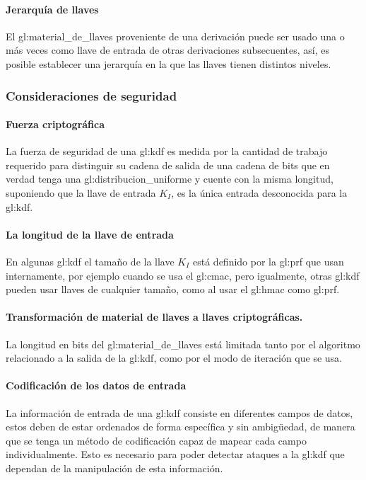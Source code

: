\paragraph{Jerarquía de llaves}
El \gls{gl:material_de_llaves} proveniente de una derivación puede ser usado
una o más veces como llave de entrada de otras derivaciones subsecuentes, así,
es posible establecer una jerarquía en la que las llaves tienen distintos
niveles.

\subsubsection{Consideraciones de seguridad}

\paragraph{Fuerza criptográfica}
La fuerza de seguridad de una \gls{gl:kdf} es medida por la cantidad de
trabajo requerido para distinguir su cadena de salida de una cadena de bits
que en verdad tenga una \gls{gl:distribucion_uniforme} y cuente con la misma
longitud, suponiendo que la llave de entrada $K_I$, es la única entrada
desconocida para la \gls{gl:kdf}.

\paragraph{La longitud de la llave de entrada}
En algunas \gls{gl:kdf} el tamaño de la llave $K_I$ está definido por la
\gls{gl:prf} que usan internamente, por ejemplo cuando se usa el \gls{gl:cmac},
pero igualmente, otras \gls{gl:kdf} pueden usar llaves de cualquier tamaño,
como al usar el \gls{gl:hmac} como \gls{gl:prf}.

\paragraph{Transformación de material de llaves a llaves criptográficas.}
La longitud en bits del \gls{gl:material_de_llaves} está limitada tanto por
el algoritmo relacionado a la salida de la \gls{gl:kdf}, como por el modo de
iteración que se usa.

\paragraph{Codificación de los datos de entrada}
La información de entrada de una \gls{gl:kdf} consiste en diferentes campos
de datos, estos deben de estar ordenados de forma específica y sin ambigüedad,
de manera que se tenga un método de codificación capaz de mapear cada campo
individualmente. Esto es necesario para poder detectar ataques a la
\gls{gl:kdf} que dependan de la manipulación de esta información.

